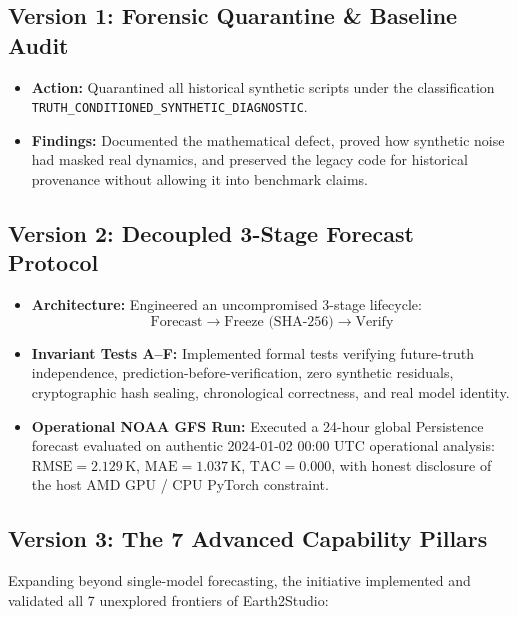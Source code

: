 \documentclass[10pt,twocolumn,a4paper]{article}
\begin{document}
\subsection{Version 1: Forensic Quarantine \& Baseline Audit}
\begin{itemize}[leftmargin=*,noitemsep]
    \item \textbf{Action:} Quarantined all historical synthetic scripts under the classification \texttt{TRUTH\_CONDITIONED\_SYNTHETIC\_DIAGNOSTIC}.
    \item \textbf{Findings:} Documented the mathematical defect, proved how synthetic noise had masked real dynamics, and preserved the legacy code for historical provenance without allowing it into benchmark claims.
\end{itemize}

\subsection{Version 2: Decoupled 3-Stage Forecast Protocol}
\begin{itemize}[leftmargin=*,noitemsep]
    \item \textbf{Architecture:} Engineered an uncompromised 3-stage lifecycle:
    \begin{equation*}
        \boxed{\text{Forecast}} \longrightarrow \boxed{\text{Freeze (SHA-256)}} \longrightarrow \boxed{\text{Verify}}
    \end{equation*}
    \item \textbf{Invariant Tests A--F:} Implemented formal tests verifying future-truth independence, prediction-before-verification, zero synthetic residuals, cryptographic hash sealing, chronological correctness, and real model identity.
    \item \textbf{Operational NOAA GFS Run:} Executed a 24-hour global Persistence forecast evaluated on authentic 2024-01-02 00:00 UTC operational analysis:
    $\text{RMSE} = 2.129\,\text{K}$, $\text{MAE} = 1.037\,\text{K}$, $\text{TAC} = 0.000$, with honest disclosure of the host AMD GPU / CPU PyTorch constraint.
\end{itemize}

\subsection{Version 3: The 7 Advanced Capability Pillars}
Expanding beyond single-model forecasting, the initiative implemented and validated all 7 unexplored frontiers of Earth2Studio:
\end{document}
